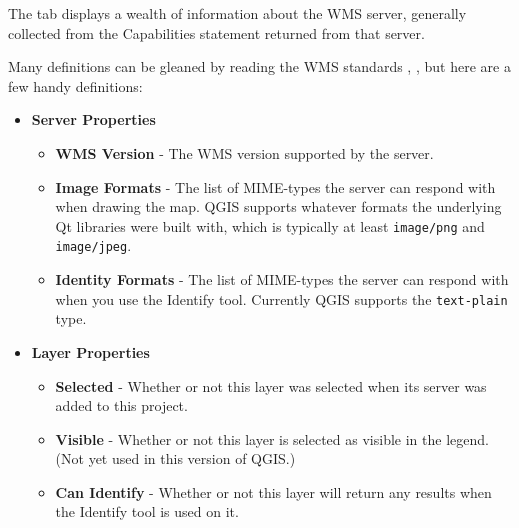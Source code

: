 \label{sec:ogc-wms-properties-metadata}

The  tab displays a wealth of information about the WMS server,
generally collected from the Capabilities statement returned from
that server.

Many definitions can be gleaned by reading the WMS
standards \cite{OGCWMS010101web}, \cite{OGCWMS010300web}, but
here are a few handy definitions:

\begin{itemize}[label=--]
\item \textbf{Server Properties}

\begin{itemize}[label=--]
\item \textbf{WMS Version}      - The WMS version supported by the server.

\item \textbf{Image Formats}    - The list of MIME-types the server can respond with when
                                  drawing the map.  QGIS supports whatever formats
                                  the underlying Qt libraries were built with, which
                                  is typically at least \texttt{image/png} 
                                  and \texttt{image/jpeg}.

\item \textbf{Identity Formats} - The list of MIME-types the server can respond with when
                                  you use the Identify tool.  Currently QGIS supports
                                  the \texttt{text-plain} type.

\end{itemize}

\item \textbf{Layer Properties}

\begin{itemize}[label=--]
\item \textbf{Selected}         - Whether or not this layer was selected when its                                                                        server was added to this project.

\item \textbf{Visible}          - Whether or not this layer is selected as visible
                                  in the legend.  (Not yet used in this version of QGIS.)

\item \textbf{Can Identify}     - Whether or not this layer will return any results
                                  when the Identify tool is used on it.


\end{itemize}
\end{itemize}
